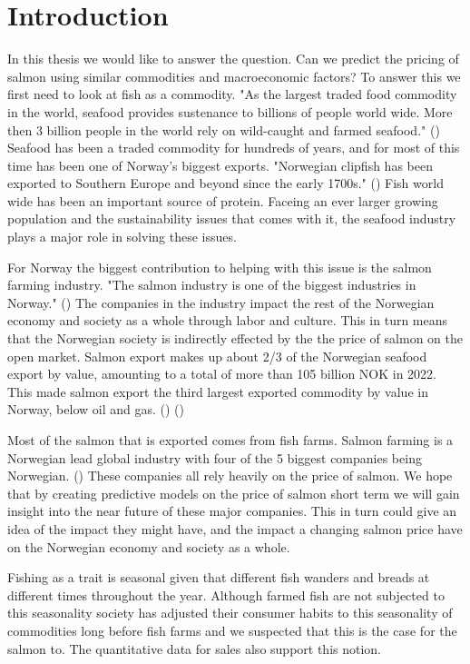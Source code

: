 \section{Introduction}

In this thesis we would like to answer the question. 
Can we predict the pricing of salmon using similar commodities and macroeconomic factors? To answer this we first need to look at fish as a commodity. "As the largest traded food commodity in the world, seafood provides sustenance to billions of people world wide. More then 3 billion people in the world rely on wild-caught and farmed seafood." (\cite{wwf_2019}) Seafood has been a traded commodity for hundreds of years, and for most of this time has been one of Norway's biggest exports. "Norwegian clipfish has been exported to Southern Europe and beyond since the early 1700s." (\cite{seafood_from_norway_clipfish}) Fish world wide has been an important source of protein. Faceing an ever larger growing population and the sustainability issues that comes with it, the seafood industry plays a major role in solving these issues.

For Norway the biggest contribution to helping with this issue is the salmon farming industry. "The salmon industry is one of the biggest industries in Norway." (\cite{Johansen_et_al_2019}) The companies in the industry impact the rest of the Norwegian economy and society as a whole through labor and culture. This in turn means that the Norwegian society is indirectly effected by the the price of salmon on the open market. Salmon export makes up about 2/3 of the Norwegian seafood export by value, amounting to a total of more than 105 billion NOK in 2022. This made salmon export the third largest exported commodity by value in Norway, below oil and gas. (\cite{e24_gasprice_2023}) (\cite{seafood_nokkeltall})

Most of the salmon that is exported comes from fish farms. Salmon farming is a Norwegian lead global industry with four of the 5 biggest companies being Norwegian. (\cite{ilaks_2020}) These companies all rely heavily on the price of salmon. We hope that by creating predictive models on the price of salmon short term we will gain insight into the near future of these major companies. This in turn could give an idea of the impact they might have, and the impact a changing salmon price have on the Norwegian economy and society as a whole.

Fishing as a trait is seasonal given that different fish wanders and breads at different times throughout the year. Although farmed fish are not subjected to this seasonality society has adjusted their consumer habits to this seasonality of commodities long before fish farms and we suspected that this is the case for the salmon to. The quantitative data for sales also support this notion.

